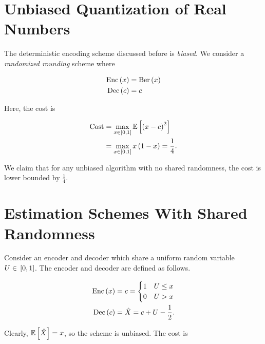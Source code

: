 \documentclass[twoside]{article}
\begin{document}



\section{Unbiased Quantization of Real Numbers}

The deterministic encoding scheme discussed before is \emph{biased}. We consider a \emph{randomized rounding} scheme where

\begin{align}
    \mathrm{Enc}\left(x\right) &= \mathrm{Ber}\left(x\right) \\
    \mathrm{Dec}\left(c\right) &= c
    \label{eq:ber-rand}
\end{align}

Here, the cost is

\begin{align}
    \mathrm{Cost} &= \max_{x\in{}\left[0,1\right]}\mathbb{E}\left[ \left(x-c\right)^2 \right] \\
                  &= \max_{x\in{}\left[0,1\right]}x\left(1-x\right) = \frac{1}{4}.
\end{align}

We claim that for any unbiased algorithm with no shared randomness, the cost is lower bounded by \(\frac{1}{4}\).

\section{Estimation Schemes With Shared Randomness}

Consider an encoder and decoder which share a uniform random variable \(U\in{}\left[0,1\right]\). The encoder and decoder are defined as follows.

\begin{align}
    \mathrm{Enc}\left(x\right) &= c =
    \begin{cases}
        1 & U \le x \\
        0 & U > x
    \end{cases} \\
    \mathrm{Dec}\left(c\right) &= \hat{X} = c + U - \frac{1}{2}.
\end{align}

Clearly, \(\mathbb{E}\left[ \hat{X} \right] = x\), so the scheme is unbiased. The cost is
\end{document}
